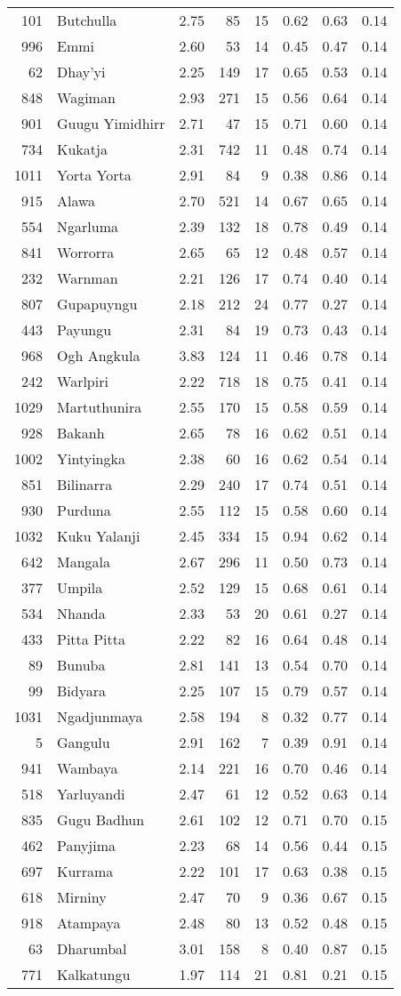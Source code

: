 \begin{longtable}[]{@{}rlrrrrrr@{}}
101 & Butchulla & 2.75 & 85 & 15 & 0.62 & 0.63 & 0.14\tabularnewline
996 & Emmi & 2.60 & 53 & 14 & 0.45 & 0.47 & 0.14\tabularnewline
62 & Dhay'yi & 2.25 & 149 & 17 & 0.65 & 0.53 & 0.14\tabularnewline
848 & Wagiman & 2.93 & 271 & 15 & 0.56 & 0.64 & 0.14\tabularnewline
901 & Guugu Yimidhirr & 2.71 & 47 & 15 & 0.71 & 0.60 &
0.14\tabularnewline
734 & Kukatja & 2.31 & 742 & 11 & 0.48 & 0.74 & 0.14\tabularnewline
1011 & Yorta Yorta & 2.91 & 84 & 9 & 0.38 & 0.86 & 0.14\tabularnewline
915 & Alawa & 2.70 & 521 & 14 & 0.67 & 0.65 & 0.14\tabularnewline
554 & Ngarluma & 2.39 & 132 & 18 & 0.78 & 0.49 & 0.14\tabularnewline
841 & Worrorra & 2.65 & 65 & 12 & 0.48 & 0.57 & 0.14\tabularnewline
232 & Warnman & 2.21 & 126 & 17 & 0.74 & 0.40 & 0.14\tabularnewline
807 & Gupapuyngu & 2.18 & 212 & 24 & 0.77 & 0.27 & 0.14\tabularnewline
443 & Payungu & 2.31 & 84 & 19 & 0.73 & 0.43 & 0.14\tabularnewline
968 & Ogh Angkula & 3.83 & 124 & 11 & 0.46 & 0.78 & 0.14\tabularnewline
242 & Warlpiri & 2.22 & 718 & 18 & 0.75 & 0.41 & 0.14\tabularnewline
1029 & Martuthunira & 2.55 & 170 & 15 & 0.58 & 0.59 &
0.14\tabularnewline
928 & Bakanh & 2.65 & 78 & 16 & 0.62 & 0.51 & 0.14\tabularnewline
1002 & Yintyingka & 2.38 & 60 & 16 & 0.62 & 0.54 & 0.14\tabularnewline
851 & Bilinarra & 2.29 & 240 & 17 & 0.74 & 0.51 & 0.14\tabularnewline
930 & Purduna & 2.55 & 112 & 15 & 0.58 & 0.60 & 0.14\tabularnewline
1032 & Kuku Yalanji & 2.45 & 334 & 15 & 0.94 & 0.62 &
0.14\tabularnewline
642 & Mangala & 2.67 & 296 & 11 & 0.50 & 0.73 & 0.14\tabularnewline
377 & Umpila & 2.52 & 129 & 15 & 0.68 & 0.61 & 0.14\tabularnewline
534 & Nhanda & 2.33 & 53 & 20 & 0.61 & 0.27 & 0.14\tabularnewline
433 & Pitta Pitta & 2.22 & 82 & 16 & 0.64 & 0.48 & 0.14\tabularnewline
89 & Bunuba & 2.81 & 141 & 13 & 0.54 & 0.70 & 0.14\tabularnewline
99 & Bidyara & 2.25 & 107 & 15 & 0.79 & 0.57 & 0.14\tabularnewline
1031 & Ngadjunmaya & 2.58 & 194 & 8 & 0.32 & 0.77 & 0.14\tabularnewline
5 & Gangulu & 2.91 & 162 & 7 & 0.39 & 0.91 & 0.14\tabularnewline
941 & Wambaya & 2.14 & 221 & 16 & 0.70 & 0.46 & 0.14\tabularnewline
518 & Yarluyandi & 2.47 & 61 & 12 & 0.52 & 0.63 & 0.14\tabularnewline
835 & Gugu Badhun & 2.61 & 102 & 12 & 0.71 & 0.70 & 0.15\tabularnewline
462 & Panyjima & 2.23 & 68 & 14 & 0.56 & 0.44 & 0.15\tabularnewline
697 & Kurrama & 2.22 & 101 & 17 & 0.63 & 0.38 & 0.15\tabularnewline
618 & Mirniny & 2.47 & 70 & 9 & 0.36 & 0.67 & 0.15\tabularnewline
918 & Atampaya & 2.48 & 80 & 13 & 0.52 & 0.48 & 0.15\tabularnewline
63 & Dharumbal & 3.01 & 158 & 8 & 0.40 & 0.87 & 0.15\tabularnewline
771 & Kalkatungu & 1.97 & 114 & 21 & 0.81 & 0.21 & 0.15\tabularnewline

\end{longtable}
